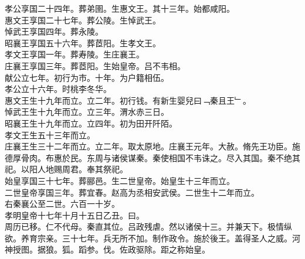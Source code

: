 \documentclass{zhvt-classic}
\begin{document}
\hspace*{2em}孝公享国二十四年。葬弟圉。生惠文王。其十三年。始都咸阳。\\
\hspace*{2em}惠文王享国二十七年。葬公陵。生悼武王。\\
\hspace*{2em}悼武王享国四年。葬永陵。\\
\hspace*{2em}昭襄王享国五十六年。葬茝阳。生孝文王。\\
\hspace*{2em}孝文王享国一年。葬寿陵。生庄襄王。\\
\hspace*{2em}庄襄王享国三年。葬茝阳。生始皇帝。吕不韦相。\\
\hspace*{2em}献公立七年。初行为市。十年。为户籍相伍。\\
\hspace*{2em}孝公立十六年。时桃李冬华。\\
\hspace*{2em}惠文王生十九年而立。立二年。初行钱。有新生婴兒曰﹁秦且王﹂。\\
\hspace*{2em}悼武王生十九年而立。立三年。渭水赤三日。\\
\hspace*{2em}昭襄王生十九年而立。立四年。初为田开阡陌。\\
\hspace*{2em}孝文王生五十三年而立。\\
\hspace*{2em}庄襄王生三十二年而立。立二年。取太原地。庄襄王元年。大赦。脩先王功臣。施德厚骨肉。布惠於民。东周与诸侯谋秦。秦使相国不韦诛之。尽入其国。秦不绝其祀。以阳人地赐周君。奉其祭祀。\\
\hspace*{2em}始皇享国三十七年。葬郦邑。生二世皇帝。始皇生十三年而立。\\
\hspace*{2em}二世皇帝享国三年。葬宜春。赵高为丞相安武侯。二世生十二年而立。\\
\hspace*{2em}右秦襄公至二世。六百一十岁。\\
\hspace*{2em}孝明皇帝十七年十月十五日乙丑。曰。\\
\hspace*{2em}周历已移。仁不代母。秦直其位。吕政残虐。然以诸侯十三。并兼天下。极情纵欲。养育宗亲。三十七年。兵无所不加。制作政令。施於後王。盖得圣人之威。河神授图。据狼。狐。蹈参。伐。佐政驱除。距之称始皇。\\
\end{document}
